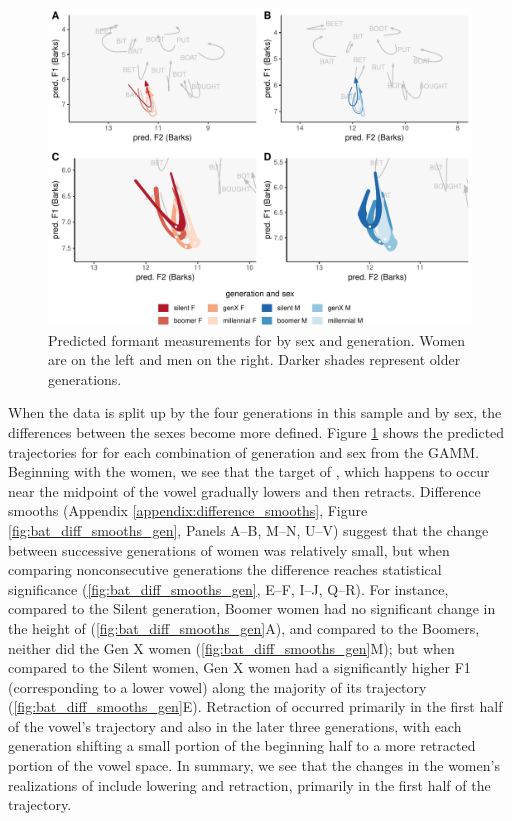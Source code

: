 \begin{figure}[tb!]
	\centering
	\includegraphics[width = 6.5in]{Figures/BAT/BAT_four_panel_plot.pdf}
	\caption[Predicted formant measurements for \bat by sex and generation.]{Predicted formant measurements for \bat by sex and generation. Women are on the left and men on the right. Darker shades represent older generations.}
	\label{fig:BAT_four_panel}
\end{figure}

When the data is split up by the four generations in this sample and by sex, the differences between the sexes become more defined. Figure \ref{fig:BAT_four_panel} shows the predicted trajectories for \bat for each combination of generation and sex from the GAMM. Beginning with the women, we see that the target of \bat, which happens to occur near the midpoint of the vowel gradually lowers and then retracts. Difference smooths (Appendix \ref{appendix:difference_smooths}, Figure \ref{fig:bat_diff_smooths_gen}, Panels A--B, M--N, U--V) suggest that the change between successive generations of women was relatively small, but when comparing nonconsecutive generations the difference reaches statistical significance (\ref{fig:bat_diff_smooths_gen}, E--F, I--J, Q--R). For instance, compared to the Silent generation, Boomer women had no significant change in the height of \bat (\ref{fig:bat_diff_smooths_gen}A), and compared to the Boomers, neither did the Gen X women (\ref{fig:bat_diff_smooths_gen}M); but when compared to the Silent women, Gen X women had a significantly higher F1 (corresponding to a lower vowel) along the majority of its trajectory (\ref{fig:bat_diff_smooths_gen}E). Retraction of \bat occurred primarily in the first half of the vowel's trajectory and also in the later three generations, with each generation shifting a small portion of the beginning half to a more retracted portion of the vowel space. In summary, we see that the changes in the women's realizations of \bat include lowering and retraction, primarily in the first half of the trajectory.

